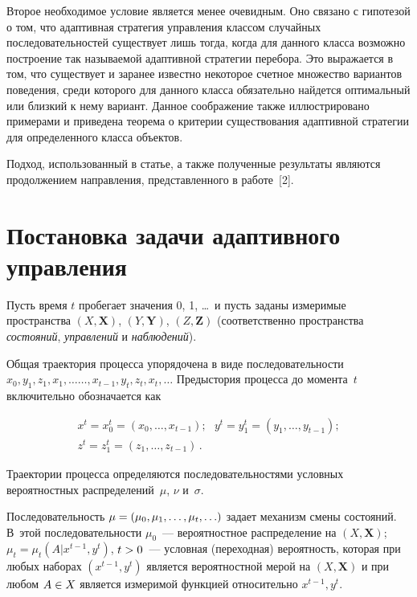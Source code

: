 \begin{multicols}{2}
  Второе необходимое условие является менее очевидным. Оно связано с гипотезой о 
том, что адаптивная стратегия управления классом случайных последовательностей 
существует лишь тогда, когда для данного класса возможно построение так называемой 
адаптивной стратегии перебора. Это выражается в том, что существует и заранее известно 
некоторое счетное множество вариантов поведения, среди которого для данного класса 
обязательно найдется оптимальный или близкий к нему вариант. Данное соображение 
также иллюстрировано примерами и приведена теорема о критерии существования 
адаптивной стратегии для определенного класса объектов.
  
  Подход, использованный в статье, а также полученные результаты являются 
продолжением направления, представленного в работе~[2].
  
\section{Постановка задачи адаптивного управления}
  
  Пусть  время $t$ пробегает значения 0, 1, \ldots\ и пусть заданы измеримые 
пространства $(X,\mathbf{X})$, $(Y,\mathbf{Y})$, $(Z,\mathbf{Z})$ (соответственно 
пространства \textit{состояний}, \textit{управлений} и \textit{наблюдений}).
  
  Общая траектория процесса упорядочена в виде последовательности $x_0, y_1, 
z_1,x_1,\ldots$\linebreak $\ldots , x_{t-1},y_t,z_t,x_t,\ldots$ Предыстория процесса до момента~$t$ 
включительно обозначается как

\noindent
  \begin{gather*}
 \! x^t=x_0^t=(x_0,\ldots , x_{t-1});\ \ \ y^t=y_1^t=(y_1, \ldots , y_{t-1});\\
  z^t=z_1^t=(z_1,  \ldots , z_{t-1})\,.
  \end{gather*}
  
  Траектории процесса определяются последовательностями условных вероятностных 
распределений~$\mu$, $\nu$ и~$\sigma$.
  
  Последовательность $\mu\hm=(\mu_0,\mu_1,\ldots ,\mu_t, \ldots)$ задает механизм 
смены состояний. В~этой последовательности $\mu_0$~--- вероятностное распределение 
на $(X,\mathbf{X})$; $\mu_t=\mu_t(A\vert x^{t-1},y^t)$, $t\hm>0$~---  условная 
(переходная) вероятность, которая при любых наборах $(x^{t-1},y^t)$ является 
вероятностной мерой на $(X,\mathbf{X})$ и при любом $A\hm\in X$ является измеримой 
функцией относительно $x^{t-1},y^t$.
  

\end{multicols}
